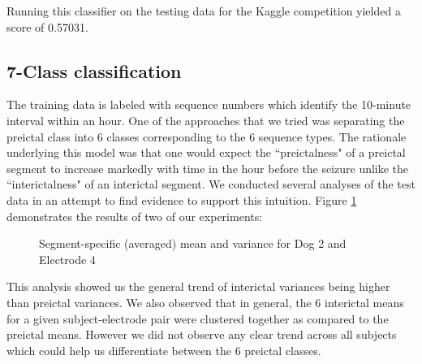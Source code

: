 \documentclass[a4paper]{article}
\begin{document}
Running this classifier on the testing data for the Kaggle competition yielded a score of 0.57031.

\subsection{7-Class classification}
The training data is labeled with sequence numbers which identify the 10-minute interval within an hour. One of the approaches that we tried was separating the preictal class into 6 classes corresponding to the 6 sequence types. The rationale underlying this model was that one would expect the ``preictalness" of a preictal segment to increase markedly with time in the hour before the seizure unlike the ``interictalness" of an interictal segment. We conducted several analyses of the test data in an attempt to find evidence to support this intuition. Figure \ref{fig:meanvar} demonstrates the results of two of our experiments:

\begin{figure}[H]
    \centering
    \qquad
    \caption{Segment-specific (averaged) mean and variance for Dog 2 and Electrode 4}%
    \label{fig:meanvar}%
\end{figure}

This analysis showed us the general trend of interictal variances being higher than preictal variances. We also observed that in general, the 6 interictal means for a given subject-electrode pair were clustered together as compared to the preictal means. However we did not observe any clear trend across all subjects which could help us differentiate between the 6 preictal classes.
\end{document}
